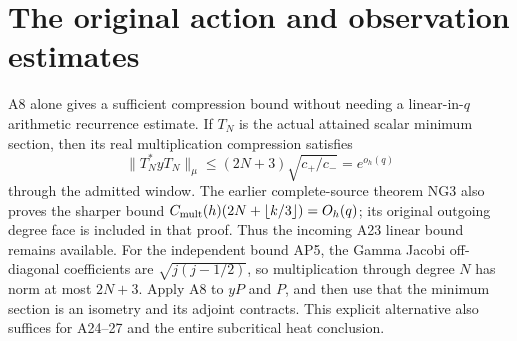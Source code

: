 \documentclass[11pt]{article}
\begin{document}
\section{The original action and observation estimates}
A8 alone gives a sufficient compression bound without needing a
linear-in-\(q\) arithmetic recurrence estimate. If \(T_N\) is the
actual attained scalar minimum section, then its real multiplication
compression satisfies
\begin{equation}\tag{AP5}
\|T_N^*yT_N\|_\mu
\le (2N+3)\sqrt{c_+/c_-}=e^{o_h(q)}
\end{equation}
through the admitted window. The earlier complete-source theorem
NG3 \cite{NG} also proves the sharper bound
\(C_{\rm mult}(h)(2N+\lfloor k/3\rfloor)=O_h(q)\);
its original outgoing degree face is included in that proof.
Thus the incoming A23 linear bound remains available.
For the independent bound AP5, the Gamma Jacobi off-diagonal
coefficients are \(\sqrt{j(j-1/2)}\), so multiplication through degree
\(N\) has norm at most \(2N+3\). Apply A8 to \(yP\) and \(P\), and
then use that the minimum section is an isometry and its adjoint
contracts. This explicit alternative also suffices for A24--27 and
the entire subcritical heat conclusion.
\end{document}
